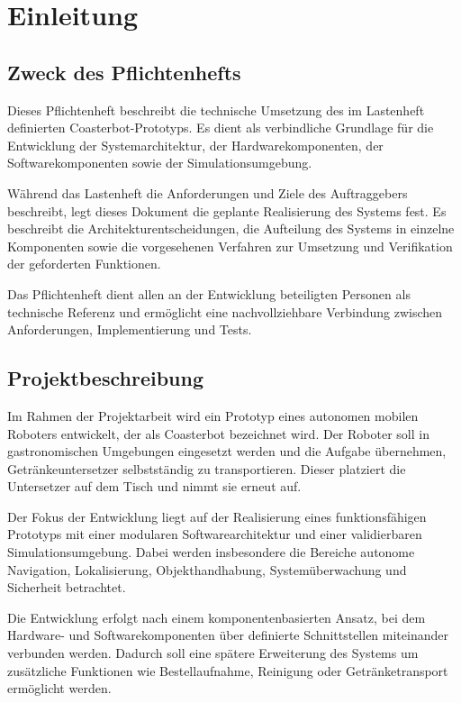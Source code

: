\section{Einleitung}\label{einleitung}

\subsection{Zweck des Pflichtenhefts}\label{zweck-des-pflichtenhefts}

Dieses Pflichtenheft beschreibt die technische Umsetzung des im
Lastenheft definierten Coasterbot-Prototyps. Es dient als verbindliche
Grundlage für die Entwicklung der Systemarchitektur, der
Hardwarekomponenten, der Softwarekomponenten sowie der
Simulationsumgebung.

Während das Lastenheft die Anforderungen und Ziele des Auftraggebers
beschreibt, legt dieses Dokument die geplante Realisierung des Systems
fest. Es beschreibt die Architekturentscheidungen, die Aufteilung des
Systems in einzelne Komponenten sowie die vorgesehenen Verfahren zur
Umsetzung und Verifikation der geforderten Funktionen.

Das Pflichtenheft dient allen an der Entwicklung beteiligten Personen
als technische Referenz und ermöglicht eine nachvollziehbare Verbindung
zwischen Anforderungen, Implementierung und Tests.

\subsection{Projektbeschreibung}\label{projektbeschreibung}

Im Rahmen der Projektarbeit wird ein Prototyp eines autonomen mobilen
Roboters entwickelt, der als Coasterbot bezeichnet wird. Der Roboter
soll in gastronomischen Umgebungen eingesetzt werden und die Aufgabe
übernehmen, Getränkeuntersetzer selbstständig zu transportieren. Dieser
platziert die Untersetzer auf dem Tisch und nimmt sie erneut auf.

Der Fokus der Entwicklung liegt auf der Realisierung eines
funktionsfähigen Prototyps mit einer modularen Softwarearchitektur und
einer validierbaren Simulationsumgebung. Dabei werden insbesondere die
Bereiche autonome Navigation, Lokalisierung, Objekthandhabung,
Systemüberwachung und Sicherheit betrachtet.

Die Entwicklung erfolgt nach einem komponentenbasierten Ansatz, bei dem
Hardware- und Softwarekomponenten über definierte Schnittstellen
miteinander verbunden werden. Dadurch soll eine spätere Erweiterung des
Systems um zusätzliche Funktionen wie Bestellaufnahme, Reinigung oder
Getränketransport ermöglicht werden.

